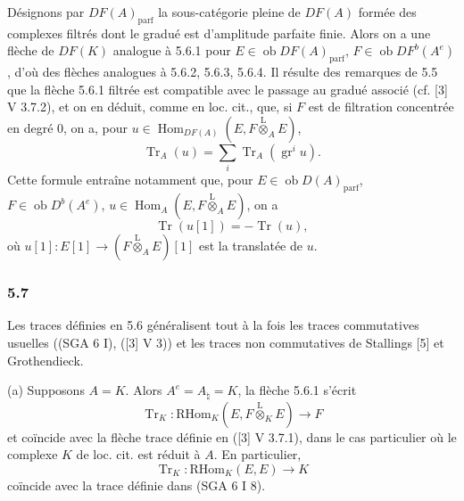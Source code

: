 \documentclass[11pt]{article}
\DeclareMathOperator{\Hom}{Hom}
\newcommand{\ob}{\operatorname{ob}}
\providecommand{\RHom}{\mathrm{RHom}}
\providecommand{\Tr}{\operatorname{Tr}}
\providecommand{\Tr}{\operatorname{Tr}}
\providecommand{\lten}{\overset{\mathrm L}{\otimes}}
\providecommand{\Tr}{\operatorname{Tr}}
\providecommand{\RHom}{\mathrm{RHom}}
\providecommand{\Hom}{\operatorname{Hom}}
\providecommand{\ob}{\operatorname{ob}}
\providecommand{\lten}{\overset{\mathrm L}{\otimes}}
\providecommand{\RHom}{\mathrm R\mathcal{H}om}
\providecommand{\lten}{\overset{\mathrm L}{\otimes}}
\providecommand{\Tr}{\operatorname{Tr}}
\providecommand{\lten}{\overset{\mathrm L}{\otimes}}
\providecommand{\lten}{\overset{\mathrm L}{\otimes}}
\providecommand{\lten}{\overset{\mathrm L}{\otimes}}
\providecommand{\RHom}{\mathrm{RHom}}
\providecommand{\Hom}{\operatorname{Hom}}
\providecommand{\Tr}{\operatorname{Tr}}
\providecommand{\lten}{\overset{\mathrm L}{\otimes}}
\begin{document}
Désignons par $DF(A)_{\mathrm{parf}}$ la sous-catégorie pleine de $DF(A)$ formée des complexes filtrés dont le gradué est d'amplitude parfaite finie. Alors on a une flèche de $DF(K)$ analogue à 5.6.1 pour $E\in\ob DF(A)_{\mathrm{parf}}$, $F\in\ob DF^b(A^e)$, d'où des flèches analogues à 5.6.2, 5.6.3, 5.6.4. Il résulte des remarques de 5.5 que la flèche 5.6.1 filtrée est compatible avec le passage au gradué associé (cf. [3] V 3.7.2), et on en déduit, comme en loc. cit., que, si $F$ est de filtration concentrée en degré $0$, on a, pour $u\in\Hom_{DF(A)}(E,F\lten_AE)$,
\begin{equation}\tag{5.6.5}
\Tr_A(u)=\sum_i\Tr_A(\operatorname{gr}^i u).
\end{equation}
Cette formule entraîne notamment que, pour $E\in\ob D(A)_{\mathrm{parf}}$, $F\in\ob D^b(A^e)$, $u\in\Hom_A(E,F\lten_AE)$, on a
\begin{equation}\tag{5.6.6}
\Tr(u[1])=-\Tr(u),
\end{equation}
où $u[1]:E[1]\to(F\lten_AE)[1]$ est la translatée de $u$.

\subsubsection*{5.7}

Les traces définies en 5.6 généralisent tout à la fois les traces commutatives usuelles ((SGA 6 I), ([3] V 3)) et les traces non commutatives de Stallings [5] et Grothendieck.

(a) Supposons $A=K$. Alors $A^e=A_\natural=K$, la flèche 5.6.1 s'écrit
\[
\Tr_K:\RHom_K(E,F\lten_KE)\longrightarrow F
\]
et coïncide avec la flèche trace définie en ([3] V 3.7.1), dans le cas particulier où le complexe $K$ de loc. cit. est réduit à $A$. En particulier,
\[
\Tr_K:\RHom_K(E,E)\longrightarrow K
\]
coïncide avec la trace définie dans (SGA 6 I 8).
\end{document}
